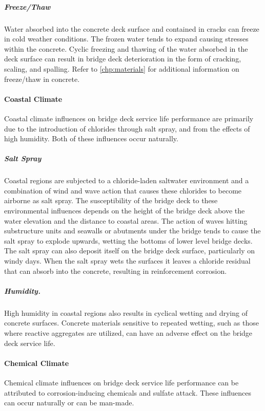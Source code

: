 \subparagraph*{Freeze/Thaw}
Water absorbed into the concrete deck surface and contained in cracks can freeze in cold weather conditions. The frozen water tends to expand causing stresses within the concrete. Cyclic freezing and thawing of the water absorbed in the deck surface can result in bridge deck deterioration in the form of cracking, scaling, and spalling. Refer to \cref{chp:materials} for additional information on freeze/thaw in concrete.

\paragraph{Coastal Climate}
Coastal climate influences on bridge deck service life performance are primarily due to the introduction of
chlorides through salt spray, and from the effects of high humidity. Both of these influences occur naturally.

\subparagraph*{Salt Spray}
Coastal regions are subjected to a chloride-laden saltwater environment and a combination of wind
and wave action that causes these chlorides to become airborne as salt spray. The susceptibility of the bridge deck to
these environmental influences depends on the height of the bridge deck above the water elevation and the distance
to coastal areas. The action of waves hitting substructure units and seawalls or abutments under the bridge tends to
cause the salt spray to explode upwards, wetting the bottoms of lower level bridge decks. The salt spray can also
deposit itself on the bridge deck surface, particularly on windy days. When the salt spray wets the surfaces it leaves a
chloride residual that can absorb into the concrete, resulting in reinforcement corrosion.

\subparagraph*{Humidity.}
High humidity in coastal regions also results in cyclical wetting and drying of concrete surfaces.
Concrete materials sensitive to repeated wetting, such as those where reactive aggregates are utilized, can have an
adverse effect on the bridge deck service life.

\paragraph{Chemical Climate}
Chemical climate influences on bridge deck service life performance can be attributed to corrosion-inducing
chemicals and sulfate attack. These influences can occur naturally or can be man-made.

